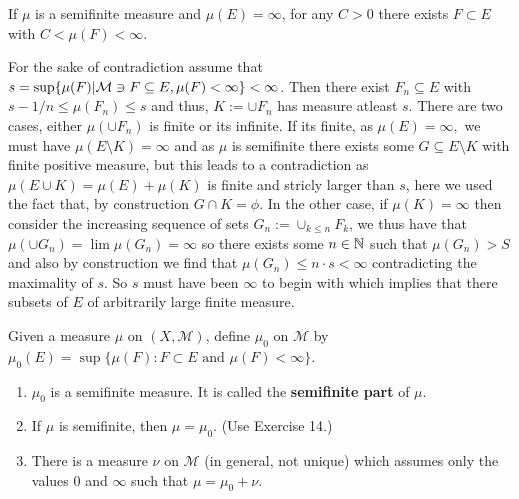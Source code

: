 \documentclass[12pt,a4paper]{article}
\begin{document}
\begin{problem}\label{prob:1-14}
If $\mu$ is a semifinite measure and $\mu(E) = \infty$, for any $C > 0$ there exists $F \subset E$ with $C < \mu(F) < \infty$.
\end{problem}
\begin{solution}
    For the sake of contradiction assume that $s=\sup\{\mu(F)|\mathcal{M}\ni F\subseteq E,\mu(F)<\infty\}<\infty$. Then there exist $F_n\subseteq E$ with $s-1/n\leq\mu(F_n)\leq s$ and thus, $K:=\cup F_n$ has measure atleast $s$. There are two cases, either $\mu(\cup F_n)$ is finite or its infinite. If its finite, as $\mu(E)=\infty,$ we must have $\mu(E\setminus K)=\infty$ and as $\mu$ is semifinite there exists some $G\subseteq E\setminus K$ with finite positive measure, but this leads to a contradiction as $\mu(E\cup K)=\mu(E)+\mu(K)$ is finite and stricly larger than $s$, here we used the fact that, by construction $G\cap K=\phi.$
    In the other case, if $\mu(K)=\infty$ then consider the increasing sequence of sets $G_n:=\cup_{k\leq n}F_k$, we thus have that $\mu(\cup G_n)=\lim\mu(G_n)=\infty$ so there exists some $n\in\mathbb{N}$ such that $\mu(G_n)>S$ and also by construction we find that $\mu(G_n)\leq n\cdot s<\infty$ contradicting the maximality of $s$. So $s$ must have been $\infty$ to begin with which implies that there subsets of $E$ of arbitrarily large finite measure.
\end{solution}
\begin{problem}\label{prob:1-15}
Given a measure $\mu$ on $(X, \mathcal{M})$, define $\mu_0$ on $\mathcal{M}$ by $\mu_0(E) = \sup\{\mu(F) : F \subset E \text{ and } \mu(F) < \infty\}$.
\begin{enumerate}[label=\alph*.]
    \item $\mu_0$ is a semifinite measure. It is called the \textbf{semifinite part} of $\mu$.
    \item If $\mu$ is semifinite, then $\mu = \mu_0$. (Use Exercise 14.)
    \item There is a measure $\nu$ on $\mathcal{M}$ (in general, not unique) which assumes only the values $0$ and $\infty$ such that $\mu = \mu_0 + \nu$.
\end{enumerate}
\end{problem}
\end{document}
